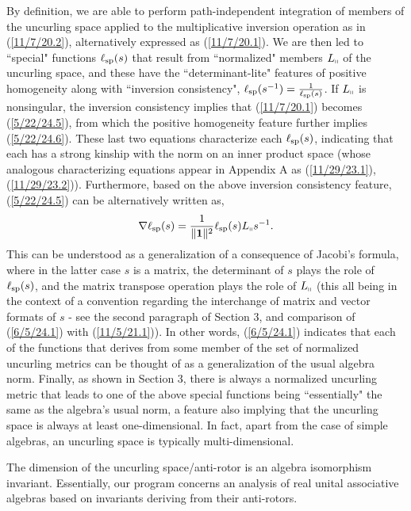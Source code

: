 \documentclass{amsart}
\numberwithin{equation}{section}
\theoremstyle{definition}
\numberwithin{theorem}{section}
\begin{document}
 By definition, we are able to perform path-independent integration of members of the uncurling space applied to the multiplicative inversion operation as in (\ref{11/7/20.2}), alternatively expressed as (\ref{11/7/20.1}).  
We are then led to ``special" functions $\ell_{\rm sp}(s)$ that result from ``normalized" members $L_{\shortparallel}$ of the uncurling space, and these have the \mbox{``determinant-lite"} features of positive homogeneity along with ``inversion consistency", $\ell_{\rm sp}(s^{-1}) = \frac{1}{\ell_{\rm sp}(s)}$.  If $L_{\shortparallel}$ is nonsingular, the inversion consistency implies that (\ref{11/7/20.1}) becomes (\ref{5/22/24.5}), from which the positive homogeneity feature further implies (\ref{5/22/24.6}).  These last two equations characterize each $\ell_{\rm sp}(s)$, indicating that each has a strong kinship with the norm on an inner product space (whose analogous characterizing equations appear in Appendix A as (\ref{11/29/23.1}),  (\ref{11/29/23.2})). Furthermore, based on the above inversion consistency feature, (\ref{5/22/24.5}) can be alternatively written as,  \begin{equation}\label{6/5/24.1} \nabla\ell_{\rm sp}(s) = \frac{1}{\|\mathbf{1}\|^{2}}\ell_{\rm sp}(s) L_{\shortparallel}s^{-1}.\end{equation} This can be understood as a generalization of a consequence of Jacobi's formula, where in the latter case $s$ is a matrix, the determinant of $s$ plays the role of $\ell_{\rm sp}(s)$, and the matrix transpose operation plays the role of $L_{\shortparallel}$ (this all being in the context of a convention regarding the interchange of matrix and vector formats of $s$  -  see the second paragraph of Section 3, and comparison of (\ref{6/5/24.1}) with (\ref{11/5/21.1})).  In other words, (\ref{6/5/24.1}) indicates that each of the functions that derives from some member of the set of normalized uncurling metrics can be thought of as a generalization of the usual algebra norm.  Finally, as shown in Section 3, there is always a normalized uncurling metric that leads to one of the above special functions being ``essentially" the same as the algebra's usual norm, a feature also implying that the uncurling space is always at least one-dimensional.  In fact, apart from the case of simple algebras, an uncurling space is typically multi-dimensional.  
      
The dimension of the uncurling space/anti-rotor is an algebra isomorphism invariant.  Essentially, our program concerns an analysis of real unital associative algebras based on invariants deriving from their anti-rotors.      
\end{document}
